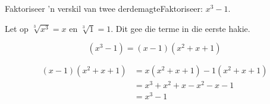 \begin{wex}{Faktoriseer 'n verskil van twee derdemagte}{Faktoriseer: $x^{3} - 1$. \vspace*{-10pt}}
{
Let op $\sqrt[3]{x^{3}} = x$ en $\sqrt[3]{1} = 1$. Dit gee die terme in die eerste hakie.

\begin{equation*}
  (x^{3} - 1) = (x-1)(x^{2}+x+1)
\end{equation*}

\begin{align*}
  (x-1)(x^{2}+x+1) &= x(x^{2}+x+1)-1(x^{2}+x+1)\\
		   &=x^{3}+x^{2}+x-x^{2}-x-1\\
		   &=x^{3}-1\\
\end{align*}
\vspace*{-50pt}
}
\end{wex}

% 
% 

